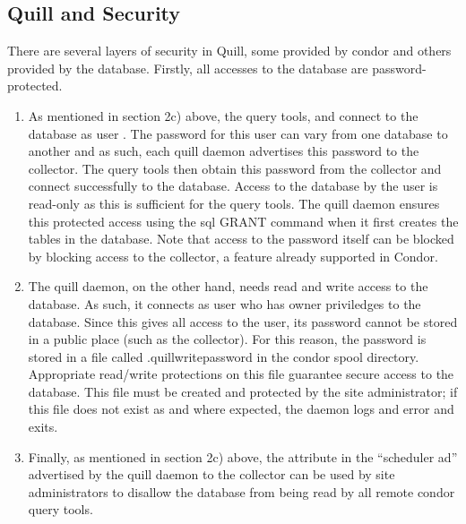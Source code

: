 \subsection{\label{sec:Quill-Security}Quill and Security}

There are several layers of security in Quill, some provided by condor and
others provided by the database.  Firstly, all accesses to the database
are password-protected.

\begin{enumerate}
\item As mentioned in section 2c) above, the query tools,  and
 connect to the database as user .
The password for this user can vary from one database to another and
as such, each quill daemon advertises this password to the collector.
The query tools then obtain this password from the collector and
connect successfully to the database.  Access to the database by the
 user is read-only as this is sufficient for the
query tools.  The quill daemon ensures this protected access using the sql
GRANT command when it first creates the tables in the database.  Note that
access to the  password itself can be blocked by
blocking access to the collector, a feature already supported in Condor.

\item The quill daemon, on the other hand, needs read and write access
to the database.  As such, it connects as user 
who has owner priviledges to the database.  Since this gives all
access to the  user, its password cannot
be stored in a public place (such as the collector).  For this
reason, the  password is stored in a file called
.quillwritepassword in the condor spool directory.  Appropriate read/write
protections on this file guarantee secure access to the database.
This file must be created and protected by the site administrator;
if this file does not exist as and where expected, the 
daemon logs and error and exits.

\item Finally, as mentioned in section 2c) above, the
 attribute in the ``scheduler ad'' advertised
by the quill daemon to the collector can be used by site administrators
to disallow the database from being read by all remote condor query tools.

\end{enumerate}

